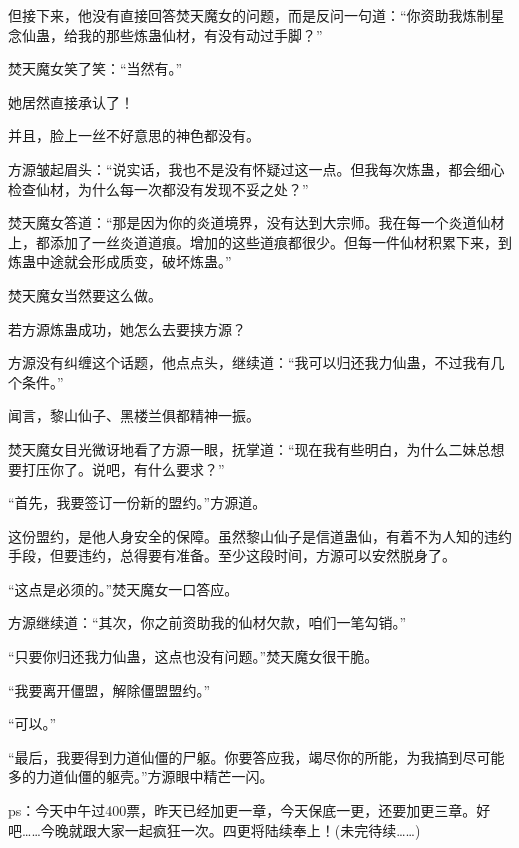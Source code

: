 \begin{this_body}
但接下来，他没有直接回答焚天魔女的问题，而是反问一句道：“你资助我炼制星念仙蛊，给我的那些炼蛊仙材，有没有动过手脚？”

焚天魔女笑了笑：“当然有。”

她居然直接承认了！

并且，脸上一丝不好意思的神色都没有。

方源皱起眉头：“说实话，我也不是没有怀疑过这一点。但我每次炼蛊，都会细心检查仙材，为什么每一次都没有发现不妥之处？”

焚天魔女答道：“那是因为你的炎道境界，没有达到大宗师。我在每一个炎道仙材上，都添加了一丝炎道道痕。增加的这些道痕都很少。但每一件仙材积累下来，到炼蛊中途就会形成质变，破坏炼蛊。”

焚天魔女当然要这么做。

若方源炼蛊成功，她怎么去要挟方源？

方源没有纠缠这个话题，他点点头，继续道：“我可以归还我力仙蛊，不过我有几个条件。”

闻言，黎山仙子、黑楼兰俱都精神一振。

焚天魔女目光微讶地看了方源一眼，抚掌道：“现在我有些明白，为什么二妹总想要打压你了。说吧，有什么要求？”

“首先，我要签订一份新的盟约。”方源道。

这份盟约，是他人身安全的保障。虽然黎山仙子是信道蛊仙，有着不为人知的违约手段，但要违约，总得要有准备。至少这段时间，方源可以安然脱身了。

“这点是必须的。”焚天魔女一口答应。

方源继续道：“其次，你之前资助我的仙材欠款，咱们一笔勾销。”

“只要你归还我力仙蛊，这点也没有问题。”焚天魔女很干脆。

“我要离开僵盟，解除僵盟盟约。”

“可以。”

“最后，我要得到力道仙僵的尸躯。你要答应我，竭尽你的所能，为我搞到尽可能多的力道仙僵的躯壳。”方源眼中精芒一闪。

ps：今天中午过400票，昨天已经加更一章，今天保底一更，还要加更三章。好吧……今晚就跟大家一起疯狂一次。四更将陆续奉上！(未完待续……)

\end{this_body}

